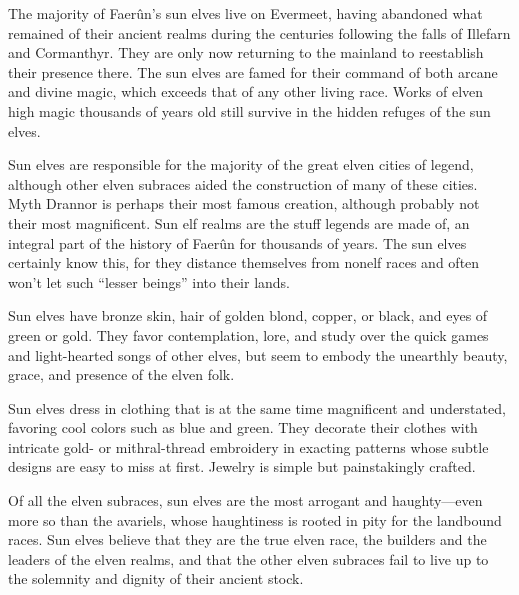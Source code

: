 
The majority of Faerûn’s sun elves live on Evermeet, having abandoned what remained of their ancient realms during the centuries following the falls of Illefarn and Cormanthyr. They are only now returning to the mainland to reestablish their presence there. The sun elves are famed for their command of both arcane and divine magic, which exceeds that of any other living race. Works of elven high magic thousands of years old still survive in the hidden refuges of the sun elves.

Sun elves are responsible for the majority of the great elven cities of legend, although other elven subraces aided the construction of many of these cities. Myth Drannor is perhaps their most famous creation, although probably not their most magnificent. Sun elf realms are the stuff legends are made of, an integral part of the history of Faerûn for thousands of years. The sun elves certainly know this, for they distance themselves from nonelf races and often won’t let such “lesser beings” into their lands.

Sun elves have bronze skin, hair of golden blond, copper, or black, and eyes of green or gold. They favor contemplation, lore, and study over the quick games and light-hearted songs of other elves, but seem to embody the unearthly beauty, grace, and presence of the elven folk.

Sun elves dress in clothing that is at the same time magnificent and understated, favoring cool colors such as blue and green. They decorate their clothes with intricate gold- or mithral-thread embroidery in exacting patterns whose subtle designs are easy to miss at first. Jewelry is simple but painstakingly crafted.

Of all the elven subraces, sun elves are the most arrogant and haughty—even more so than the avariels, whose haughtiness is rooted in pity for the landbound races. Sun elves believe that they are the true elven race, the builders and the leaders of the elven realms, and that the other elven subraces fail to live up to the solemnity and dignity of their ancient stock.

